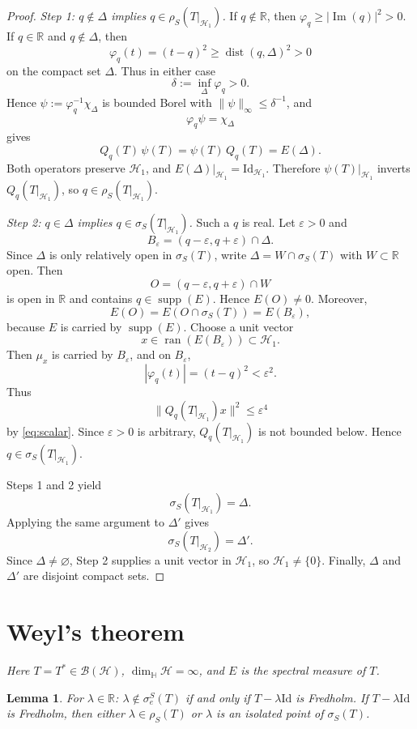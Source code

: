 \documentclass[12pt,a4paper]{article}
\theoremstyle{plain}
\newtheorem{lemma}[theorem]{Lemma}
\theoremstyle{definition}
\theoremstyle{remark}
\newcommand{\HH}{\mathbb H}
\newcommand{\RR}{\mathbb R}
\newcommand{\BB}{\mathcal B}
\newcommand{\Id}{\mathrm{Id}}
\newcommand{\HS}{\mathcal H}
\newcommand{\dimH}{\dim_{\HH}}
\newcommand{\sigS}{\sigma_S}
\newcommand{\sigeS}{\sigma_{e}^{S}}
\newcommand{\rhoS}{\rho_S}
\DeclareMathOperator{\ran}{ran}
\DeclareMathOperator{\dist}{dist}
\DeclareMathOperator{\supp}{supp}
\DeclareMathOperator{\Ima}{Im}
\begin{document}
{\begin{proof}
\emph{Step 1: \(q\notin\Delta\) implies \(q\in\rhoS(T|_{\HS_1})\).}
If \(q\notin\RR\), then \(\varphi_q\ge |\Ima(q)|^2>0\). If \(q\in\RR\) and \(q\notin\Delta\), then
\[
\varphi_q(t)=(t-q)^2\ge \dist(q,\Delta)^2>0
\]
on the compact set \(\Delta\). Thus in either case
\[
\delta:=\inf_{\Delta}\varphi_q>0.
\]
Hence \(\psi:=\varphi_q^{-1}\chi_\Delta\) is bounded Borel with \(\|\psi\|_\infty\le\delta^{-1}\), and
\[
\varphi_q\psi=\chi_\Delta
\]
gives
\[
Q_q(T)\,\psi(T)=\psi(T)\,Q_q(T)=E(\Delta).
\]
Both operators preserve \(\HS_1\), and \(E(\Delta)|_{\HS_1}=\Id_{\HS_1}\). Therefore \(\psi(T)|_{\HS_1}\) inverts \(Q_q(T|_{\HS_1})\), so \(q\in\rhoS(T|_{\HS_1})\).

\emph{Step 2: \(q\in\Delta\) implies \(q\in\sigS(T|_{\HS_1})\).}
Such a \(q\) is real. Let \(\varepsilon>0\) and
\[
B_\varepsilon=(q-\varepsilon,q+\varepsilon)\cap\Delta .
\]
Since \(\Delta\) is only relatively open in \(\sigS(T)\), write \(\Delta=W\cap\sigS(T)\) with \(W\subset\RR\) open. Then
\[
O=(q-\varepsilon,q+\varepsilon)\cap W
\]
is open in \(\RR\) and contains \(q\in\supp(E)\). Hence \(E(O)\neq0\). Moreover,
\[
E(O)=E(O\cap\sigS(T))=E(B_\varepsilon),
\]
because \(E\) is carried by \(\supp(E)\). Choose a unit vector
\[
x\in\ran(E(B_\varepsilon))\subset\HS_1 .
\]
Then \(\mu_x\) is carried by \(B_\varepsilon\), and on \(B_\varepsilon\),
\[
|\varphi_q(t)|=(t-q)^2<\varepsilon^2 .
\]
Thus
\[
\|Q_q(T|_{\HS_1})x\|^2\le\varepsilon^4
\]
by \eqref{eq:scalar}. Since \(\varepsilon>0\) is arbitrary, \(Q_q(T|_{\HS_1})\) is not bounded below. Hence \(q\in\sigS(T|_{\HS_1})\).

Steps 1 and 2 yield
\[
\sigS(T|_{\HS_1})=\Delta .
\]
Applying the same argument to \(\Delta'\) gives
\[
\sigS(T|_{\HS_2})=\Delta' .
\]
Since \(\Delta\neq\varnothing\), Step 2 supplies a unit vector in \(\HS_1\), so \(\HS_1\neq\{0\}\). Finally, \(\Delta\) and \(\Delta'\) are disjoint compact sets.
\end{proof}



\section{Weyl's theorem}
\label{sec:main}

\emph{Here $T=T^*\in\BB(\HS)$, $\dimH\HS=\infty$, and $E$ is the
spectral measure of $T$.}

\begin{lemma}
\label{lem:fredholm}
For $\lambda\in\RR$: $\lambda\notin\sigeS(T)$ if and only if
$T-\lambda\Id$ is Fredholm. If $T-\lambda\Id$ is Fredholm, then either
$\lambda\in\rhoS(T)$ or $\lambda$ is an isolated point of $\sigS(T)$.
\end{lemma}




}
\end{document}
